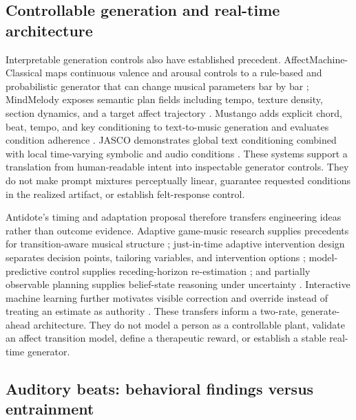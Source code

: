 \subsection{Controllable generation and real-time architecture}
\label{sec:related-controllable-generation}

Interpretable generation controls also have established precedent.
AffectMachine-Classical maps continuous valence and arousal controls to a
rule-based and probabilistic generator that can change musical parameters bar
by bar \citep{agres2023affectmachine}; MindMelody exposes semantic plan fields
including tempo, texture density, section dynamics, and a target affect
trajectory \citep{zhang2026mindmelody}. Mustango adds explicit chord, beat,
tempo, and key conditioning to text-to-music generation and evaluates
condition adherence \citep{melechovsky2024mustango}. JASCO demonstrates global
text conditioning combined with local time-varying symbolic and audio
conditions \citep{tal2024jasco}. These systems support a translation from
human-readable intent into inspectable generator controls. They do not make
prompt mixtures perceptually linear, guarantee requested conditions in the
realized artifact, or establish felt-response control.

Antidote's timing and adaptation proposal therefore transfers engineering
ideas rather than outcome evidence. Adaptive game-music research supplies
precedents for transition-aware musical structure
\citep{hutchings2020adaptive}; just-in-time adaptive intervention design
separates decision points, tailoring variables, and intervention options
\citep{nahumshani2018jitai}; model-predictive control supplies receding-horizon
re-estimation \citep{garcia1989mpc}; and partially observable planning supplies
belief-state reasoning under uncertainty \citep{kaelbling1998pomdp}.
Interactive machine learning further motivates visible correction and override
instead of treating an estimate as authority \citep{amershi2014interactive}.
These transfers inform a two-rate, generate-ahead architecture. They do not
model a person as a controllable plant, validate an affect transition model,
define a therapeutic reward, or establish a stable real-time generator.

\subsection{Auditory beats: behavioral findings versus entrainment}
\label{sec:related-auditory-beats}

